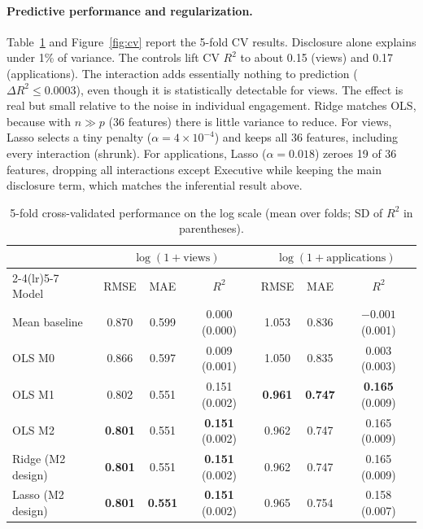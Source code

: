 \documentclass{article}
\begin{document}
\paragraph{Predictive performance and regularization.} Table~\ref{tab:cv} and Figure~\ref{fig:cv} report the 5-fold CV results. Disclosure alone explains under 1\% of variance. The controls lift CV $R^2$ to about 0.15 (views) and 0.17 (applications). The interaction adds essentially nothing to prediction ($\Delta R^2 \le 0.0003$), even though it is statistically detectable for views. The effect is real but small relative to the noise in individual engagement. Ridge matches OLS, because with $n\gg p$ (36 features) there is little variance to reduce. For views, Lasso selects a tiny penalty ($\alpha=4\times10^{-4}$) and keeps all 36 features, including every interaction (shrunk). For applications, Lasso ($\alpha=0.018$) zeroes 19 of 36 features, dropping all interactions except Executive while keeping the main disclosure term, which matches the inferential result above.

\begin{table}[h]
  \centering
  \caption{5-fold cross-validated performance on the log scale (mean over folds; SD of $R^2$ in parentheses).}
  \label{tab:cv}
  \small
  \begin{tabular}{lccc@{\hspace{14pt}}ccc}
    \toprule
    & \multicolumn{3}{c}{$\log(1+\text{views})$} & \multicolumn{3}{c}{$\log(1+\text{applications})$} \\
    \cmidrule(lr){2-4}\cmidrule(lr){5-7}
    Model & RMSE & MAE & $R^2$ & RMSE & MAE & $R^2$ \\
    \midrule
    Mean baseline          & 0.870 & 0.599 & 0.000 (0.000) & 1.053 & 0.836 & $-0.001$ (0.001) \\
    OLS M0                 & 0.866 & 0.597 & 0.009 (0.001) & 1.050 & 0.835 & 0.003 (0.003) \\
    OLS M1                 & 0.802 & 0.551 & 0.151 (0.002) & \textbf{0.961} & \textbf{0.747} & \textbf{0.165} (0.009) \\
    OLS M2                 & \textbf{0.801} & 0.551 & \textbf{0.151} (0.002) & 0.962 & 0.747 & 0.165 (0.009) \\
    Ridge (M2 design)      & \textbf{0.801} & 0.551 & \textbf{0.151} (0.002) & 0.962 & 0.747 & 0.165 (0.009) \\
    Lasso (M2 design)      & \textbf{0.801} & \textbf{0.551} & \textbf{0.151} (0.002) & 0.965 & 0.754 & 0.158 (0.007) \\
    \bottomrule
  \end{tabular}
\end{table}
\end{document}
